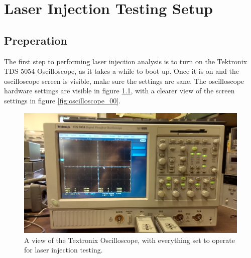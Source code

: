 \documentclass{report}
\begin{document}
    \chapter{ Laser Injection Testing Setup } \label{sect:methods}
        \section{ Preperation }
            The first step to performing laser injection analysis is to turn on the Tektronix TDS 5054 Oscilloscope, as it takes a while to boot up. Once it is on and the oscilloscope screen is visible, make sure the settings are sane. The oscilloscope hardware settings are visible in figure \ref{fig:oscilloscope_01}, with a clearer view of the screen settings in figure \ref{fig:oscilloscope_00}.

            \begin{figure}[h] 
                \includegraphics[height=.4\textheight]{oscilloscope_01}
                \centering
                \caption{ A view of the Textronix Oscilloscope, with everything set to operate for laser injection testing.}
                \label{fig:oscilloscope_01}
            \end{figure}
\end{document}
